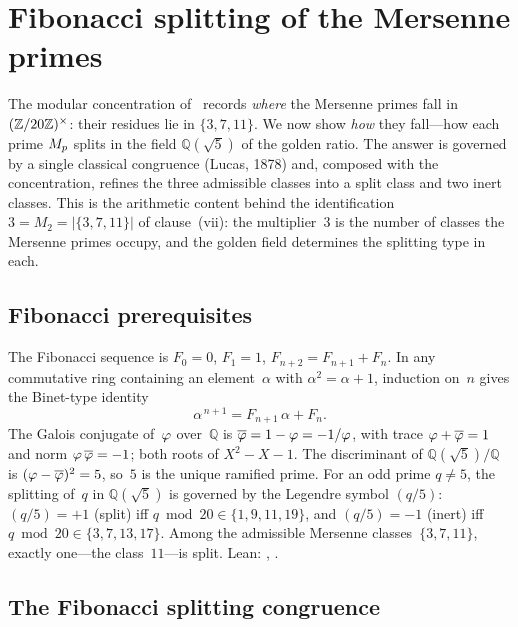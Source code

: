 \section{Fibonacci splitting of the Mersenne primes}
\label{sec:fibonacci}

The modular concentration of~ records
\emph{where} the Mersenne primes fall in $(\mathbb{Z}/20\mathbb{Z})^{\times}$: their residues lie
in $\{3,7,11\}$.  We now show \emph{how} they fall---how each prime
$M_{p}$ splits in the field $\mathbb{Q}(\sqrt5)$ of the golden ratio.  The
answer is governed by a single classical congruence (Lucas, 1878) and,
composed with the concentration, refines the three admissible classes
into a split class and two inert classes.  This is the arithmetic
content behind the identification $3=M_{2}=|\{3,7,11\}|$ of
clause~(vii): the multiplier~$3$ is the number of classes the Mersenne
primes occupy, and the golden field determines the splitting type in
each.

\subsection{Fibonacci prerequisites}
\label{ssec:fib-prereq}

The Fibonacci sequence is $F_{0}=0$, $F_{1}=1$, $F_{n+2}=F_{n+1}+F_{n}$.
In any commutative ring containing an element~$\alpha$ with
$\alpha^{2}=\alpha+1$, induction on~$n$ gives the Binet-type identity
\begin{equation}\label{eq:binet}
  \alpha^{\,n+1} = F_{n+1}\,\alpha + F_{n}.
\end{equation}
The Galois conjugate of~$\varphi$ over~$\mathbb{Q}$ is
$\overline{\varphi}=1-\varphi=-1/\varphi$, with trace
$\varphi+\overline{\varphi}=1$ and norm
$\varphi\,\overline{\varphi}=-1$; both roots of $X^{2}-X-1$.  The
discriminant of $\mathbb{Q}(\sqrt5)/\mathbb{Q}$ is
$(\varphi-\overline{\varphi})^{2}=5$, so~$5$ is the unique ramified
prime.  For an odd prime $q\neq5$, the splitting of~$q$ in
$\mathbb{Q}(\sqrt5)$ is governed by the Legendre symbol $(q/5)$:
$(q/5)=+1$ (split) iff $q\bmod 20\in\{1,9,11,19\}$, and $(q/5)=-1$
(inert) iff $q\bmod 20\in\{3,7,13,17\}$.  Among the admissible Mersenne
classes~$\{3,7,11\}$, exactly one---the class~$11$---is split.
Lean: , .

\subsection{The Fibonacci splitting congruence}
\label{ssec:fib-congruence}

